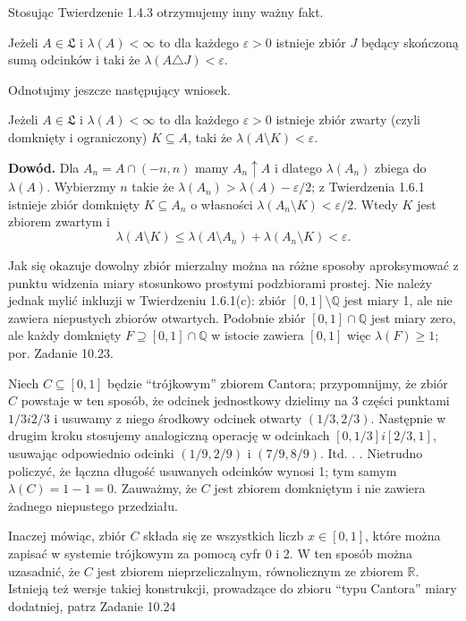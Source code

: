 Stosując Twierdzenie 1.4.3 otrzymujemy inny ważny fakt.

\begin{theorem}[1.6.2]
Jeżeli \( A \in \mathfrak{L} \) i \(\lambda(A) < \infty \) to dla każdego \(\varepsilon > 0\) istnieje zbiór \( J \) będący skończoną sumą odcinków i taki że \(\lambda(A \triangle J) < \varepsilon\).
\end{theorem}

Odnotujmy jeszcze następujący wniosek.

\begin{corollary}[1.6.3]
Jeżeli \( A \in \mathfrak{L} \) i \(\lambda(A) < \infty \) to dla każdego \(\varepsilon > 0\) istnieje zbiór zwarty (czyli domknięty i ograniczony) \( K \subseteq A \), taki że \(\lambda(A \setminus K) < \varepsilon \).
\end{corollary}

\textbf{Dowód.} Dla \( A_n = A \cap (-n,n) \) mamy \( A_n \uparrow A \) i dlatego \(\lambda(A_n)\) zbiega do \(\lambda(A)\). Wybierzmy \( n \) takie że \(\lambda(A_n) > \lambda(A) - \varepsilon/2\); z Twierdzenia 1.6.1 istnieje zbiór domknięty \( K \subseteq A_n \) o własności \(\lambda(A_n \setminus K) < \varepsilon/2\). Wtedy \( K \) jest zbiorem zwartym i
\[
\lambda(A \setminus K) \leq \lambda(A \setminus A_n) + \lambda(A_n \setminus K) < \varepsilon.
\]

Jak się okazuje dowolny zbiór mierzalny można na różne sposoby aproksymować z punktu widzenia miary stosunkowo prostymi podzbiorami prostej. Nie należy jednak mylić inkluzji w Twierdzeniu 1.6.1(c): zbiór \([0,1] \setminus \mathbb{Q}\) jest miary 1, ale nie zawiera niepustych zbiorów otwartych. Podobnie zbiór \([0,1] \cap \mathbb{Q}\) jest miary zero, ale każdy domknięty \(F \supseteq [0,1] \cap \mathbb{Q}\) w istocie zawiera \([0,1]\) więc \(\lambda(F) \geq 1\); por. Zadanie 10.23.

\begin{eg}[1.6.4]
Niech \(C \subseteq [0,1]\) będzie “trójkowym” zbiorem Cantora; przypomnijmy, że zbiór \(C\) powstaje w ten sposób, że odcinek jednostkowy dzielimy na 3 części punktami \(1/3 i 2/3\) i usuwamy z niego środkowy odcinek otwarty \((1/3, 2/3)\). Następnie w drugim kroku stosujemy analogiczną operację w odcinkach \([0,1/3] i [2/3, 1]\), usuwając odpowiednio odcinki \((1/9, 2/9)\) i \((7/9, 8/9)\). Itd. . . Nietrudno policzyć, że łączna długość usuwanych odcinków wynosi 1; tym samym \(\lambda(C) = 1 - 1 = 0\). Zauważmy, że \(C\) jest zbiorem domkniętym i nie zawiera żadnego niepustego przedziału.

Inaczej mówiąc, zbiór \(C\) składa się ze wszystkich liczb \(x \in [0,1]\), które można zapisać w systemie trójkowym za pomocą cyfr 0 i 2. W ten sposób można uzasadnić, że \(C\) jest zbiorem nieprzeliczalnym, równolicznym ze zbiorem \(\mathbb{R}\). Istnieją też wersje takiej konstrukcji, prowadzące do zbioru “typu Cantora” miary dodatniej, patrz Zadanie 10.24 
\end{eg}

